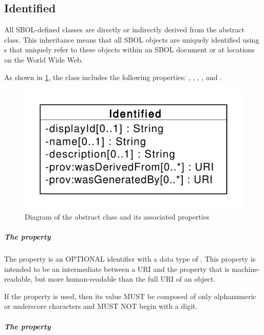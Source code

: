 \subsection{Identified}
\label{sec:Identified}

All SBOL-defined classes are directly or indirectly derived from the   abstract class.
This inheritance means that all SBOL objects are uniquely identified using s that uniquely refer to these objects within an SBOL document or at locations on the World Wide Web.

As shown in \ref{uml:identified}, the  class includes the following properties: ,  , , , and . 

\begin{figure}[ht]
\begin{center}
\includegraphics[scale=0.6]{uml/identified}
\caption[]{Diagram of the  abstract class and its associated properties}
\label{uml:identified}
\end{center}
\end{figure}
  
\subparagraph{The  property}
\label{sec:displayId}
The  property is an OPTIONAL identifier with a data type of . This property is intended to be an intermediate between a URI and the  property that is machine-readable, but more human-readable than the full URI of an object.

If the  property is used, then its  value MUST be composed of only alphanumeric or underscore characters and MUST NOT begin with a digit.

\subparagraph{The  property}
\label{sec:name}

